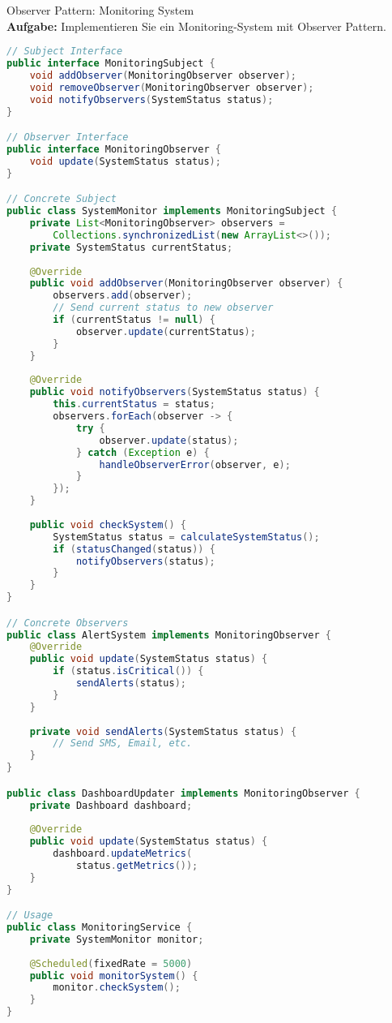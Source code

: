 \begin{example2}{Observer Pattern: Monitoring System}\\
\textbf{Aufgabe:} Implementieren Sie ein Monitoring-System mit Observer Pattern.

\begin{lstlisting}[language=Java, style=basesmol]
// Subject Interface
public interface MonitoringSubject {
    void addObserver(MonitoringObserver observer);
    void removeObserver(MonitoringObserver observer);
    void notifyObservers(SystemStatus status);
}

// Observer Interface
public interface MonitoringObserver {
    void update(SystemStatus status);
}

// Concrete Subject
public class SystemMonitor implements MonitoringSubject {
    private List<MonitoringObserver> observers = 
        Collections.synchronizedList(new ArrayList<>());
    private SystemStatus currentStatus;
    
    @Override
    public void addObserver(MonitoringObserver observer) {
        observers.add(observer);
        // Send current status to new observer
        if (currentStatus != null) {
            observer.update(currentStatus);
        }
    }
    
    @Override
    public void notifyObservers(SystemStatus status) {
        this.currentStatus = status;
        observers.forEach(observer -> {
            try {
                observer.update(status);
            } catch (Exception e) {
                handleObserverError(observer, e);
            }
        });
    }
    
    public void checkSystem() {
        SystemStatus status = calculateSystemStatus();
        if (statusChanged(status)) {
            notifyObservers(status);
        }
    }
}

// Concrete Observers
public class AlertSystem implements MonitoringObserver {
    @Override
    public void update(SystemStatus status) {
        if (status.isCritical()) {
            sendAlerts(status);
        }
    }
    
    private void sendAlerts(SystemStatus status) {
        // Send SMS, Email, etc.
    }
}

public class DashboardUpdater implements MonitoringObserver {
    private Dashboard dashboard;
    
    @Override
    public void update(SystemStatus status) {
        dashboard.updateMetrics(
            status.getMetrics());
    }
}

// Usage
public class MonitoringService {
    private SystemMonitor monitor;
    
    @Scheduled(fixedRate = 5000)
    public void monitorSystem() {
        monitor.checkSystem();
    }
}
\end{lstlisting}
\end{example2}


